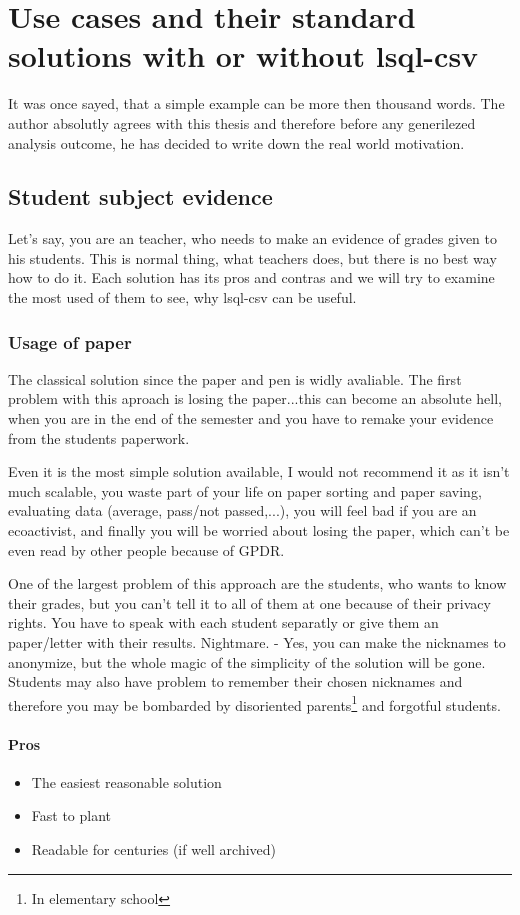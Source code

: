 \chapter{Use cases and their standard solutions with or without lsql-csv}
It was once sayed, that a simple example can be more then thousand words. The author absolutly agrees with this thesis and therefore before any generilezed analysis outcome, he has decided to write down the real world motivation.

\section{Student subject evidence}
Let's say, you are an teacher, who needs to make an evidence of grades given to his students. This is normal thing, what teachers does, but there is no best way how to do it. Each solution has its pros and contras and we will try to examine the most used of them to see, why lsql-csv can be useful.

\subsection{Usage of paper}
The classical solution since the paper and pen is widly avaliable. The first problem with this aproach is losing the paper...this can become an absolute hell, when you are in the end of the semester and you have to remake your evidence from the students paperwork. 

Even it is the most simple solution available, I would not recommend it as it isn't much scalable, you waste part of your life on paper sorting and paper saving, evaluating data (average, pass/not passed,...), you will feel bad if you are an ecoactivist, and finally you will be worried about losing the paper, which can't be even read by other people because of GPDR.

One of the largest problem of this approach are the students, who wants to know their grades, but you can't tell it to all of them at one because of their privacy rights. You have to speak with each student separatly or give them an paper/letter with their results. Nightmare. - Yes, you can make the nicknames to anonymize, but the whole magic of the simplicity of the solution will be gone. Students may also have problem to remember their chosen nicknames and therefore you may be bombarded by disoriented parents\footnote{In elementary school} and forgotful students.

\subsubsection{Pros}
\begin{itemize}
\item The easiest reasonable solution
\item Fast to plant
\item Readable for centuries (if well archived)

\end{itemize}

